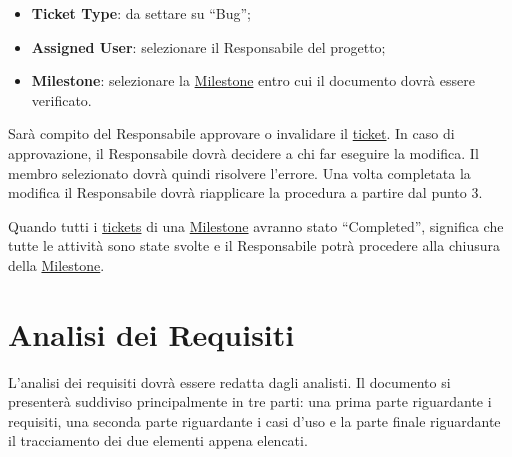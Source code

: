 \begin{enumerate}
\begin{itemize}
\item \textbf{Ticket Type}: da settare su ``Bug'';
\item \textbf{Assigned User}: selezionare il Responsabile del progetto;
\item \textbf{Milestone}: selezionare la \underline{Milestone} entro cui il documento dovrà essere verificato.
\end{itemize}
Sarà  compito del Responsabile approvare o invalidare il \underline{ticket}. In caso di approvazione, il Responsabile dovrà decidere a chi far eseguire la modifica. Il membro selezionato dovrà quindi risolvere l'errore. Una volta completata la modifica il Responsabile dovrà riapplicare la procedura a partire dal punto 3.
\end{enumerate}
Quando tutti i \underline{tickets} di una \underline{Milestone} avranno stato ``Completed'', significa che tutte le attività sono state svolte e il Responsabile potrà procedere alla chiusura della \underline{Milestone}.

\newpage
\section{Analisi dei Requisiti}
L'analisi dei requisiti dovrà essere redatta dagli analisti. Il documento si presenterà suddiviso principalmente in tre parti: una prima parte riguardante i requisiti, una seconda parte riguardante i casi d'uso e la parte finale riguardante il tracciamento dei due elementi appena elencati.

